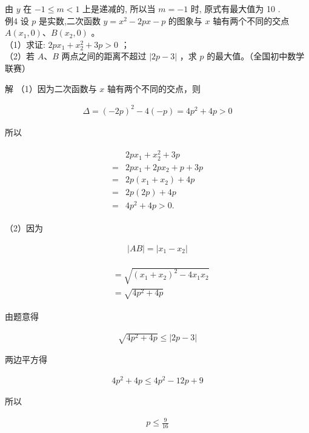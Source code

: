\documentclass[10pt]{article}
\begin{document}
由 $y$ 在 $-1 \leqslant m<1$ 上是递减的, 所以当 $m=-1$ 时, 原式有最大值为 10 .\\
例4 设 $p$ 是实数,二次函数 $y=x^{2}-2 p x-p$ 的图象与 $x$ 轴有两个不同的交点 $A\left(x_{1}, 0\right) 、 B\left(x_{2}, 0\right)$ 。\\
（1）求证: $2 p x_{1}+x_{2}^{2}+3 p>0$ ；\\
（2）若 $A 、 B$ 两点之间的距离不超过 $|2 p-3|$ ，求 $p$ 的最大值。（全国初中数学联赛）

解 （1）因为二次函数与 $x$ 轴有两个不同的交点，则

\begin{align*}
\Delta=(-2 p)^{2}-4(-p)=4 p^{2}+4 p>0
\end{align*}

所以

\begin{align*}
\begin{aligned}
& 2 p x_{1}+x_{2}^{2}+3 p \\
= & 2 p x_{1}+2 p x_{2}+p+3 p \\
= & 2 p\left(x_{1}+x_{2}\right)+4 p \\
= & 2 p(2 p)+4 p \\
= & 4 p^{2}+4 p>0 .
\end{aligned}
\end{align*}

（2）因为

\begin{align*}
|A B|=\left|x_{1}-x_{2}\right|
\end{align*}

\begin{align*}
\begin{aligned}
& =\sqrt{\left(x_{1}+x_{2}\right)^{2}-4 x_{1} x_{2}} \\
& =\sqrt{4 p^{2}+4 p}
\end{aligned}
\end{align*}

由题意得

\begin{align*}
\sqrt{4 p^{2}+4 p} \leqslant|2 p-3|
\end{align*}

两边平方得

\begin{align*}
4 p^{2}+4 p \leqslant 4 p^{2}-12 p+9
\end{align*}

所以

\begin{align*}
p \leqslant \frac{9}{16}
\end{align*}
\end{document}
